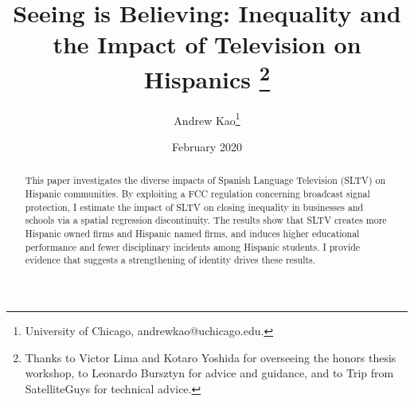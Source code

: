 \documentclass[11pt]{article}
\begin{document}
\title{\textbf{Seeing is Believing: Inequality and the Impact of Television on Hispanics}%
\thanks{Thanks to Victor Lima and Kotaro Yoshida for overseeing the honors thesis workshop, to Leonardo Bursztyn for advice and guidance, and to Trip from SatelliteGuys for technical advice.}\\
}



\author{Andrew Kao\thanks{University of Chicago, andrewkao@uchicago.edu.} }

\date{February 2020}
{\vspace{-5ex}}


\maketitle

\begin{abstract}
\noindent This paper investigates the diverse impacts of Spanish Language Television (SLTV) on Hispanic communities. By exploiting a FCC regulation concerning broadcast signal protection, I estimate the impact of SLTV on closing inequality in businesses and schools via a spatial regression discontinuity. The results show that SLTV creates more Hispanic owned firms and Hispanic named firms, and induces higher educational performance and fewer disciplinary incidents among Hispanic students. I provide evidence that suggests a strengthening of identity drives these results. 




\end{abstract}
\end{document}
